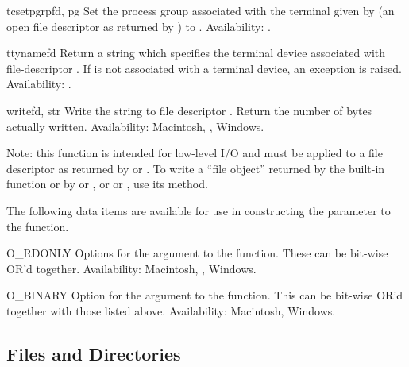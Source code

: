 \begin{funcdesc}{tcsetpgrp}{fd, pg}
Set the process group associated with the terminal given by
 (an open file descriptor as returned by )
to .
Availability: \UNIX{}.
\end{funcdesc}

\begin{funcdesc}{ttyname}{fd}
Return a string which specifies the terminal device associated with
file-descriptor .  If  is not associated with a terminal
device, an exception is raised.
Availability: \UNIX{}.
\end{funcdesc}

\begin{funcdesc}{write}{fd, str}
Write the string  to file descriptor .
Return the number of bytes actually written.
Availability: Macintosh, \UNIX{}, Windows.

Note: this function is intended for low-level I/O and must be applied
to a file descriptor as returned by  or
.  To write a ``file object'' returned by the
built-in function  or by  or
, or  or , use
its  method.
\end{funcdesc}


The following data items are available for use in constructing the
 parameter to the  function.

\begin{datadesc}{O_RDONLY}
Options for the  argument to the  function.
These can be bit-wise OR'd together.
Availability: Macintosh, \UNIX{}, Windows.
\end{datadesc}

\begin{datadesc}{O_BINARY}
Option for the  argument to the  function.
This can be bit-wise OR'd together with those listed above.
Availability: Macintosh, Windows.
\end{datadesc}


\subsection{Files and Directories \label{os-file-dir}}

